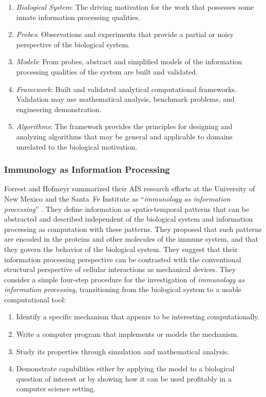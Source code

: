 \begin{enumerate}
	\item \emph{Biological System}: The driving motivation for the work that possesses some innate information processing qualities. 
	\item \emph{Probes}: Observations and experiments that provide a partial or noisy perspective of the biological system.
	\item \emph{Models}: From probes, abstract and simplified models of the information processing qualities of the system are built and validated.
	\item \emph{Framework}: Built and validated analytical computational frameworks. Validation may use mathematical analysis, benchmark problems, and engineering demonstration.
	\item \emph{Algorithms}: The framework provides the principles for designing and analyzing algorithms that may be general and applicable to domains unrelated to the biological motivation.
\end{enumerate}



% 
% 
\subsubsection{Immunology as Information Processing}
Forrest and Hofmeyr summarized their AIS research efforts at the University of New Mexico and the Santa~Fe Institute as ``\emph{immunology as information processing}'' \cite{Forrest2001}. They define information as spatio-temporal patterns that can be abstracted and described independent of the biological system and information processing as computation with these patterns. They proposed that such patterns are encoded in the proteins and other molecules of the immune system, and that they govern the behavior of the biological system. They suggest that their information processing perspective can be contrasted with the conventional structural perspective of cellular interactions as mechanical devices. They consider a simple four-step procedure for the investigation of \emph{immunology as information processing}, transitioning from the biological system to a usable computational tool:

\begin{enumerate}
	\item Identify a specific mechanism that appears to be interesting computationally.
	\item Write a computer program that implements or models the mechanism.
	\item Study its properties through simulation and mathematical analysis.
	\item Demonstrate capabilities either by applying the model to a biological question of interest or by showing how it can be used profitably in a computer science setting.
\end{enumerate}

